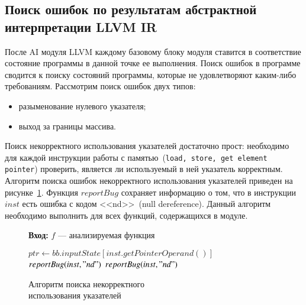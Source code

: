 \subsection{Поиск ошибок по результатам абстрактной интерпретации LLVM IR}
После AI модуля LLVM каждому базовому блоку модуля ставится в соответствие
состояние программы в данной точке ее выполнения. Поиск ошибок в программе
сводится к поиску состояний программы, которые не удовлетворяют каким-либо
требованиям. Рассмотрим поиск ошибок двух типов:
\begin{itemize}
\item разыменование нулевого указателя;
\item выход за границы массива.
\end{itemize}

Поиск некорректного использования указателей достаточно прост: необходимо для
каждой инструкции работы с памятью~(\texttt{load, store, get element pointer}) проверить, 
является ли используемый в ней указатель корректным. Алгоритм поиска ошибок
некорректного использования указателей приведен на 
рисунке~\ref{image:ndChecker}. Функция $reportBug$ сохраняет информацию
о том, что в инструкции $inst$ есть ошибка с кодом <<nd>>~(null dereference). 
Данный алгоритм необходимо выполнить для всех функций, содержащихся в модуле.
\begin{figure}[h!]
\textbf{Вход:} $f$ --- анализируемая функция

\begin{algorithmic}[1]
            \State $ptr \gets bb.inputState[inst.getPointerOperand()]$
                \State $reportBug(inst, "nd")$
                \State $reportBug(inst, "nd")$
            \EndIf
        \EndIf
    \EndFor
\EndFor
\end{algorithmic}
\caption{Алгоритм поиска некорректного\\использования указателей}
\label{image:ndChecker}
\end{figure}

